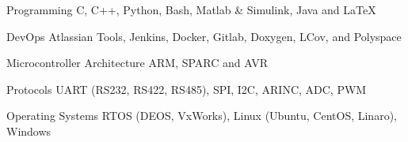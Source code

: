 

\begin{cvskills}

  \cvskill
    {Programming} %
	{C, C++, Python, Bash, Matlab \& Simulink, Java and LaTeX} %

%

%
  \cvskill
    {DevOps} %
    {Atlassian Tools, Jenkins, Docker, Gitlab, Doxygen, LCov, and Polyspace} %

  \cvskill
    {Microcontroller Architecture} %
    {ARM, SPARC and AVR} %

  \cvskill
    {Protocols} %
	{UART (RS232, RS422, RS485), SPI, I2C, ARINC, ADC, PWM} %

  \cvskill
    {Operating Systems} %
	{RTOS (DEOS, VxWorks), Linux (Ubuntu, CentOS, Linaro), Windows} %


\end{cvskills}
